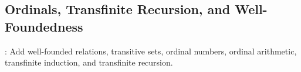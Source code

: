 \subsection{Ordinals, Transfinite Recursion, and Well-Foundedness}

: Add well-founded relations, transitive sets, ordinal numbers, ordinal arithmetic, transfinite induction, and transfinite recursion.
